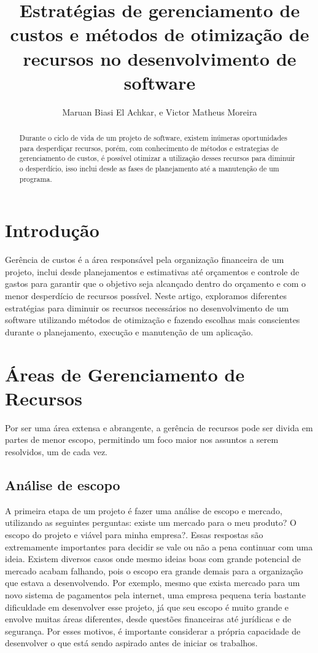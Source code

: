 \documentclass{article}
\title{Estratégias de gerenciamento de custos e métodos de otimização de recursos no desenvolvimento de software}
\author{Maruan Biasi El Achkar, e Victor Matheus Moreira}
\begin{document}
\maketitle


\begin{abstract}
Durante o ciclo de vida de um projeto de software, existem inúmeras oportunidades para desperdiçar recursos, porém, com conhecimento de métodos e estrategias de gerenciamento de custos, é possível otimizar a utilização desses recursos para diminuir o desperdício, isso inclui desde as fases de planejamento até a manutenção de um programa.
\end{abstract}

\section{Introdução}
Gerência de custos é a área responsável pela organização financeira de um projeto, inclui desde planejamentos e estimativas até orçamentos e controle de gastos para garantir que o objetivo seja alcançado dentro do orçamento e com o menor desperdício de recursos possível. Neste artigo, exploramos diferentes estratégias para diminuir os recursos necessários no desenvolvimento de um software utilizando métodos de otimização e fazendo escolhas mais conscientes durante o planejamento, execução e manutenção de um aplicação.

\section{Áreas de Gerenciamento de Recursos}
Por ser uma área extensa e abrangente, a gerência de recursos pode ser divida em partes de menor escopo, permitindo um foco maior nos assuntos a serem resolvidos, um de cada vez.

\subsection{Análise de escopo}
A primeira etapa de um projeto é fazer uma análise de escopo e mercado, utilizando as seguintes perguntas: existe um mercado para o meu produto? O escopo do projeto e viável para minha empresa?. Essas respostas são extremamente importantes para decidir se vale ou não a pena continuar com uma ideia. Existem diversos casos onde mesmo ideias boas com grande potencial de mercado acabam falhando, pois o escopo era grande demais para a organização que estava a desenvolvendo. Por exemplo, mesmo que exista mercado para um novo sistema de pagamentos pela internet, uma empresa pequena teria bastante dificuldade em desenvolver esse projeto, já que seu escopo é muito grande e envolve muitas áreas diferentes, desde questões financeiras até jurídicas e de segurança. Por esses motivos, é importante considerar a própria capacidade de desenvolver o que está sendo aspirado antes de iniciar os trabalhos.
\end{document}
